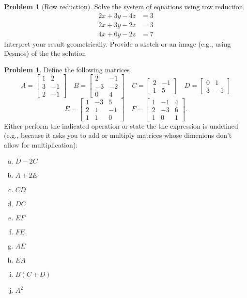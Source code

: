 \documentclass[10pt]{article}
\theoremstyle{definition}
\newtheorem{problem}[theorem]{Problem}
\newcommand{\1}[1]{\textbf{1}_{\left[#1\right]}} %
\begin{document}
\begin{problem}[Row reduction]
  Solve the system of equations using row reduction
  \begin{align*}
    2x+3y-4z&=3\\
    2x+3y-2z&=3\\
    4x+6y-2z&=7
  \end{align*}
  Interpret your result geometrically. Provide a sketch or an image (e.g.,
  using Desmos) of the the solution
\end{problem}

\begin{problem}
  Define the following matrices
  \begin{equation*}
    A =
    \begin{bmatrix}
      1&2\\
      3&-1\\
      2&-1
    \end{bmatrix}
    \quad
    B =
    \begin{bmatrix}
      2&-1\\
      -3&-2\\
      0&4
    \end{bmatrix}
    \quad
    C =
    \begin{bmatrix}
      2&-1\\
      1&5
    \end{bmatrix}
    \quad
    D =
    \begin{bmatrix}
      0&1\\
      3&-1
    \end{bmatrix}
  \end{equation*}
  \begin{equation*}
    E =
    \begin{bmatrix}
      1&-3&5\\
      2&1&-1\\
      1&1&0
    \end{bmatrix}
    \quad
    F =
    \begin{bmatrix}
      1&-1&4\\
      2&-3&6\\
      1&0&1
    \end{bmatrix}.
  \end{equation*}
  Either perform the indicated operation or state the the expression is
  undefined (e.g., because it asks you to add or multiply matrices whose dimenions
  don't allow for multiplication):
  \begin{enumerate}[(a)]
    \item $D-2C$
    \item $A+2E$
    \item $CD$
    \item $DC$
    \item $EF$
    \item $FE$
    \item $AE$
    \item $EA$
    \item $B(C+D)$
    \item $A^{2}$
  \end{enumerate}
\end{problem}
\end{document}
